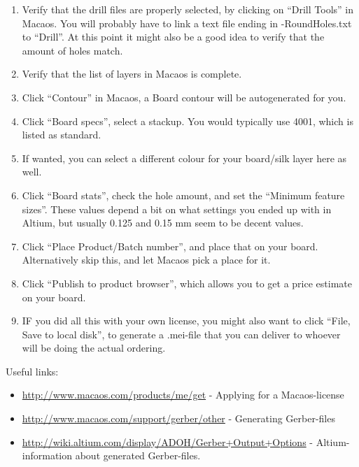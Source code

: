 \begin {enumerate}
  make sure these are not negative, if so then select Negative Layer 1/2 instead
  of Inner Layer 1/2), the Copper-layers will likely be GTL and GBL, make sure
  these are correct too. Additional files include the Keepout (GKO), which can
  be used as ``Board''.
\item Verify that the drill files are properly selected, by clicking on ``Drill
  Tools'' in Macaos. You will probably have to link a text file ending in
  -RoundHoles.txt to ``Drill''. At this point it might also be a good idea to
  verify that the amount of holes match.
\item Verify that the list of layers in Macaos is complete.
\item Click ``Contour'' in Macaos, a Board contour will be autogenerated for
  you.
\item Click ``Board specs'', select a stackup. You would typically use 4001,
  which is listed as standard.
\item If wanted, you can select a different colour for your board/silk layer
  here as well.
\item Click ``Board stats'', check the hole amount, and set the ``Minimum
  feature sizes''. These values depend a bit on what settings you ended up with
  in Altium, but usually 0.125 and 0.15 mm seem to be decent values.
\item Click ``Place Product/Batch number'', and place that on your board.
  Alternatively skip this, and let Macaos pick a place for it.
\item Click ``Publish to product browser'', which allows you to get a price
  estimate on your board.
\item IF you did all this with your own license, you might also want to click
  ``File, Save to local disk'', to generate a .mei-file that you can deliver to
  whoever will be doing the actual ordering.
\end {enumerate}

Useful links:
\begin {itemize}
\item \url{http://www.macaos.com/products/me/get} - Applying for a
  Macaos-license
\item \url{http://www.macaos.com/support/gerber/other} - Generating Gerber-files
\item \url{http://wiki.altium.com/display/ADOH/Gerber+Output+Options} -
  Altium-information about generated Gerber-files.
\end {itemize}
